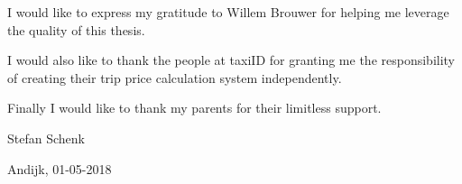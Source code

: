 
\begin{acknowledgements}

{\parindent0pt
	I would like to express my gratitude to Willem Brouwer for helping me leverage the quality of this thesis. \newline

	I would also like to thank the people at taxiID for granting me the responsibility of creating their trip price calculation system independently. \newline

	Finally I would like to thank my parents for their limitless support. \newline

	Stefan Schenk \newline

	Andijk, 01-05-2018
}

\end{acknowledgements}
